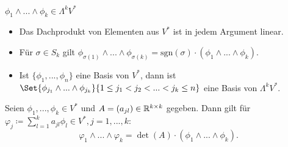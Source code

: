 \documentclass{cheat-sheet}
\begin{document}
\begin{bem}
  $\phi_1 \wedge ... \wedge \phi_k \in \Lambda^k V^*$
\end{bem}

\begin{eign}
  \begin{itemize}
    \item Das Dachprodukt von Elementen aus $V^*$ ist in jedem Argument linear.
    \item Für $\sigma \in S_k$ gilt $\phi_{\sigma(1)} \wedge ... \wedge \phi_{\sigma(k)} = \mathrm{sgn}(\sigma) \cdot (\phi_1 \wedge ... \wedge \phi_k)$.
  \end{itemize}
\end{eign}

\begin{prop}
  \begin{itemize}
    \item Ist $\{ \phi_1, ..., \phi_n \}$ eine Basis von $V^*$, dann ist $\Set{ \phi_{j_1} \wedge ... \wedge \phi_{j_k} }{ 1 \leq j_1 < j_2 < ... < j_k \leq n }$ eine Basis von $\Lambda^k V^*$.

    \vspace{4pt}

  \end{itemize}
\end{prop}

\begin{prop}
  Seien $\phi_1, ..., \phi_k \in V^*$ und $A = (a_{jl}) \in \mathbb{R}^{k \times k}$ gegeben.
  Dann gilt für $\varphi_j \coloneqq \sum_{l=1}^k a_{jl} \phi_l \in V^*, j = 1, ..., k$:
  \[ \varphi_1 \wedge ... \wedge \varphi_k = \det(A) \cdot (\phi_1 \wedge ... \wedge \phi_k). \]
\end{prop}
\end{document}
